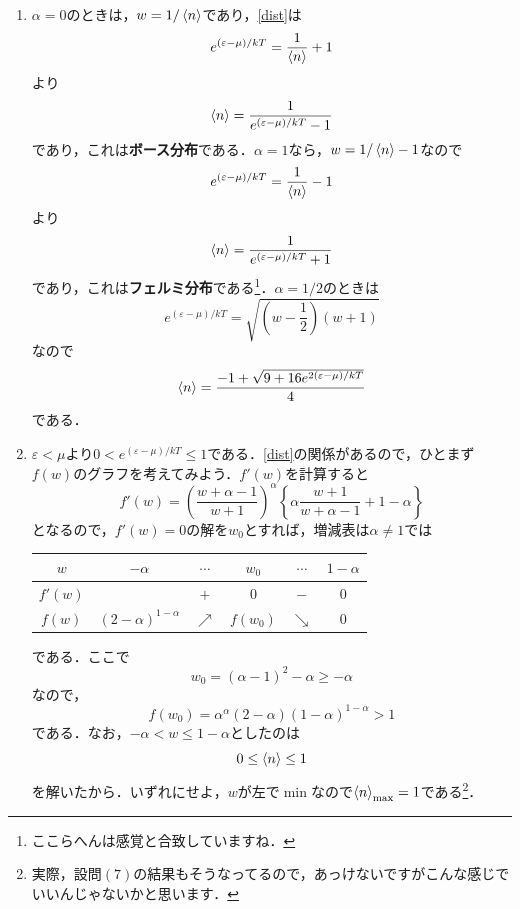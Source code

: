 \documentclass[a4paper,pdflatex,ja=standard]{bxjsarticle}
\begin{document}
\begin{enumerate}
  \item 
  $\alpha=0$のときは，$w=1/\ev{n}$であり，\eqref{dist}は
  \begin{equation}
    e^{(\varepsilon-\mu)/kT}
    =
    \frac{1}{\ev{n}}+1
  \end{equation}
  より
  \begin{equation}
    \ev{n}
    =
    \frac{1}{e^{(\varepsilon-\mu)/kT}-1}
  \end{equation}
  であり，これは\textbf{ボース分布}である．$\alpha=1$なら，$w=1/\ev{n}-1$なので
  \begin{equation}
    e^{(\varepsilon-\mu)/kT}
    =
    \frac{1}{\ev{n}}-1
  \end{equation}
  より
  \begin{equation}
    \ev{n}
    =
    \frac{1}{e^{(\varepsilon-\mu)/kT}+1}
  \end{equation}
  であり，これは\textbf{フェルミ分布}である\footnote{
    ここらへんは感覚と合致していますね．
  }．$\alpha=1/2$のときは
  \begin{equation}
    e^{(\varepsilon-\mu)/kT}
    =
    \sqrt{\left( w-\frac{1}{2} \right)(w+1)}
  \end{equation}
  なので
  \begin{equation}
    \ev{n}
    =
    \frac{-1+\sqrt{9+16e^{2(\varepsilon-\mu)/kT}}}{4}
  \end{equation}
  である．

  \item 
  $\varepsilon<\mu$より$0<e^{(\varepsilon-\mu)/kT}\leq1$である．\eqref{dist}の関係があるので，ひとまず$f(w)$のグラフを考えてみよう．$f'(w)$を計算すると
  \begin{equation}
    f'(w)
    =
    \left( \frac{w+\alpha-1}{w+1} \right)^{\alpha}
    \left\{  
      \alpha\frac{w+1}{w+\alpha-1}
      +
      1-\alpha
    \right\}
  \end{equation}
  となるので，$f'(w)=0$の解を$w_{0}$とすれば，増減表は$\alpha\neq 1$では
  \begin{center}
    \begin{tabular}{c||ccccc}
      $w$ & $-\alpha$ & $\cdots$ & $w_{0}$ & $\cdots$ & $1-\alpha$ \\
      \hline
      $f'(w)$ &  & $+$ & $0$ & $-$ & $0$ \\
      \hline
      $f(w)$ & $(2-\alpha)^{1-\alpha}$ & $\nearrow$ & $f(w_{0})$ & $\searrow$ &  $0$
    \end{tabular}
  \end{center}  
  である．ここで
  \begin{equation}
    w_{0}
    =
    (\alpha-1)^2-\alpha\geq-\alpha
  \end{equation}
  なので，
  \begin{equation}
    f(w_{0})
    =
    \alpha^{\alpha}(2-\alpha)(1-\alpha)^{1-\alpha}>1
  \end{equation}
  である．なお，$-\alpha<w\leq 1-\alpha$としたのは
  \begin{equation}
    0\leq\ev{n}\leq 1
  \end{equation}
  を解いたから．いずれにせよ，$w$が左で$\min$なので$\ev{n}_{\max}=1$である\footnote{
    実際，設問$(7)$の結果もそうなってるので，あっけないですがこんな感じでいいんじゃないかと思います．
  }．


\end{enumerate}
\end{document}
